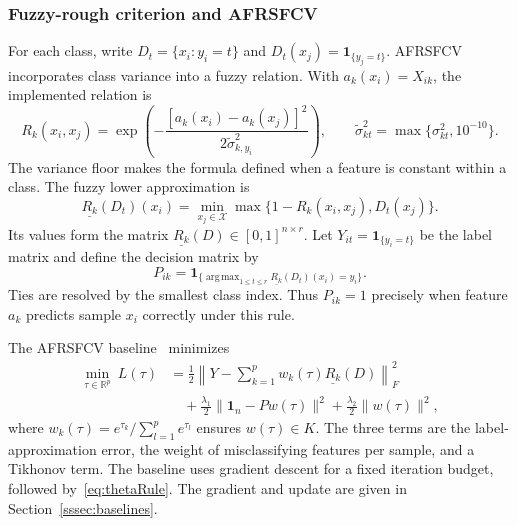 \documentclass[]{interact}
\theoremstyle{plain}
\theoremstyle{definition}
\theoremstyle{remark}
\newcommand{\R}{\mathbb{R}}
\DeclareMathOperator*{\argmax}{arg\,max}
\begin{document}
\subsubsection{Fuzzy-rough criterion and AFRSFCV}\label{ssec:afrsfcv}\label{sssec:afrsfcv-inputs}\label{sssec:afrsfcv-model}
For each class, write $D_t=\{x_i:y_i=t\}$ and $D_t(x_j)=\mathbf1_{\{y_j=t\}}$. AFRSFCV incorporates class variance into a fuzzy relation. With $a_k(x_i)=X_{ik}$, the implemented relation is
\begin{equation}\label{eq:simRel}
R_k(x_i,x_j)=\exp\!\left(-\frac{[a_k(x_i)-a_k(x_j)]^2}{2\widetilde\sigma_{k,y_i}^2}\right),
\qquad \widetilde\sigma_{kt}^2=\max\{\sigma_{kt}^2,10^{-10}\}.
\end{equation}
The variance floor makes the formula defined when a feature is constant within a class. The fuzzy lower approximation is
\begin{equation}\label{eq:lower}
\underline{R_k}(D_t)(x_i)=\min_{x_j\in\mathcal{X}}\max\{1-R_k(x_i,x_j),D_t(x_j)\}.
\end{equation}
Its values form the matrix $\underline{R_k}(D)\in[0,1]^{n\times r}$. Let $Y_{it}=\mathbf1_{\{y_i=t\}}$ be the label matrix and define the decision matrix by
\begin{equation}\label{eq:Pmat}
P_{ik}=\mathbf1_{\{\argmax_{1\le t\le r}\underline{R_k}(D_t)(x_i)=y_i\}}.
\end{equation}
Ties are resolved by the smallest class index. Thus $P_{ik}=1$ precisely when feature $a_k$ predicts sample $x_i$ correctly under this rule.

The AFRSFCV baseline~\citep{wang2026afrsfcv} minimizes
\begin{equation}\label{eq:afrsfcvLoss}
\begin{split}
\min_{\tau\in\R^p}\ L(\tau)
&=\frac12\left\|Y-\sum_{k=1}^{p}w_k(\tau)\underline{R_k}(D)\right\|_F^2\\
&\quad+\frac{\lambda_1}{2}\|\mathbf1_n-Pw(\tau)\|^2+\frac{\lambda_2}{2}\|w(\tau)\|^2,
\end{split}
\end{equation}
where $w_k(\tau)=e^{\tau_k}/\sum_{l=1}^{p}e^{\tau_l}$ ensures $w(\tau)\in K$. The three terms are the label-approximation error, the weight of misclassifying features per sample, and a Tikhonov term. The baseline uses gradient descent for a fixed iteration budget, followed by~\eqref{eq:thetaRule}. The gradient and update are given in Section~\ref{sssec:baselines}.
\end{document}
